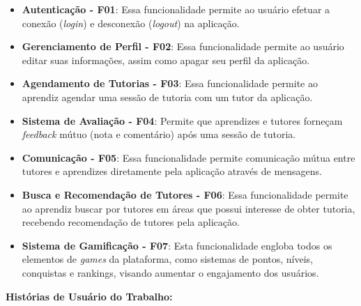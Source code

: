 \begin{itemize}
\item \textbf{Autenticação - F01}: Essa funcionalidade permite ao usuário efetuar a conexão (\textit{login}) e desconexão (\textit{logout}) na aplicação.

\item \textbf{Gerenciamento de Perfil - F02}: Essa funcionalidade permite ao usuário editar suas informações, assim como apagar seu perfil da aplicação.

\item \textbf{Agendamento de Tutorias - F03}: Essa funcionalidade permite ao aprendiz agendar uma sessão de tutoria com um tutor da aplicação.

\item \textbf{Sistema de Avaliação - F04}: Permite que aprendizes e tutores forneçam \textit{feedback} mútuo (nota e comentário) após uma sessão de tutoria.

\item \textbf{Comunicação - F05}: Essa funcionalidade permite comunicação mútua entre tutores e aprendizes diretamente pela aplicação através de mensagens.

\item \textbf{Busca e Recomendação de Tutores - F06}: Essa funcionalidade permite ao aprendiz buscar por tutores em áreas que possui interesse de obter tutoria, recebendo recomendação de tutores pela aplicação.

\item \textbf{Sistema de Gamificação - F07}: Esta funcionalidade engloba todos os elementos de \textit{games} da plataforma, como sistemas de pontos, níveis, conquistas e rankings, visando aumentar o engajamento dos usuários.

\end{itemize}

\textbf{Histórias de Usuário do Trabalho:}

